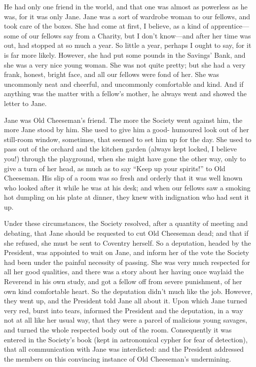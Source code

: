 He had only one friend in the world, and that one was almost as
powerless as he was, for it was only Jane.  Jane was a sort of
wardrobe woman to our fellows, and took care of the boxes.  She had
come at first, I believe, as a kind of apprentice---some of our
fellows say from a Charity, but I don't know---and after her time was
out, had stopped at so much a year.  So little a year, perhaps I
ought to say, for it is far more likely.  However, she had put some
pounds in the Savings' Bank, and she was a very nice young woman.
She was not quite pretty; but she had a very frank, honest, bright
face, and all our fellows were fond of her.  She was uncommonly neat
and cheerful, and uncommonly comfortable and kind.  And if anything
was the matter with a fellow's mother, he always went and showed the
letter to Jane.

Jane was Old Cheeseman's friend.  The more the Society went against
him, the more Jane stood by him.  She used to give him a good-%
humoured look out of her still-room window, sometimes, that seemed
to set him up for the day.  She used to pass out of the orchard and
the kitchen garden (always kept locked, I believe you!) through the
playground, when she might have gone the other way, only to give a
turn of her head, as much as to say ``Keep up your spirits!'' to Old
Cheeseman.  His slip of a room was so fresh and orderly that it was
well known who looked after it while he was at his desk; and when
our fellows saw a smoking hot dumpling on his plate at dinner, they
knew with indignation who had sent it up.

Under these circumstances, the Society resolved, after a quantity of
meeting and debating, that Jane should be requested to cut Old
Cheeseman dead; and that if she refused, she must be sent to
Coventry herself.  So a deputation, headed by the President, was
appointed to wait on Jane, and inform her of the vote the Society
had been under the painful necessity of passing.  She was very much
respected for all her good qualities, and there was a story about
her having once waylaid the Reverend in his own study, and got a
fellow off from severe punishment, of her own kind comfortable
heart.  So the deputation didn't much like the job.  However, they
went up, and the President told Jane all about it.  Upon which Jane
turned very red, burst into tears, informed the President and the
deputation, in a way not at all like her usual way, that they were a
parcel of malicious young savages, and turned the whole respected
body out of the room.  Consequently it was entered in the Society's
book (kept in astronomical cypher for fear of detection), that all
communication with Jane was interdicted:  and the President
addressed the members on this convincing instance of Old Cheeseman's
undermining.

